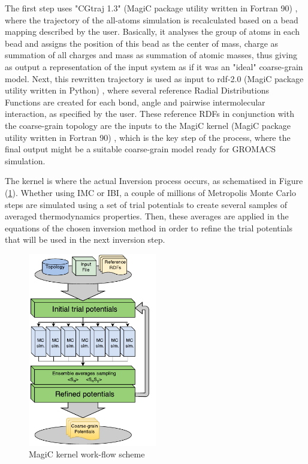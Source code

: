 \documentclass[10pt,a4paper,twoside]{article}
\begin{document}
 The first step uses "CGtraj 1.3" (MagiC package utility written in Fortran 90) \cite{magicmanu}, where the trajectory of the all-atoms simulation is recalculated based on a bead mapping described by the user. Basically, it analyses the group of atoms in each bead and assigns the position of this bead as the center of mass, charge as summation of all charges and mass as summation of atomic masses, thus giving as output a representation of the input system as if it was an "ideal" coarse-grain model. Next, this rewritten trajectory is used as input to rdf-2.0  (MagiC package utility written in Python) \cite{magicmanu}, where several reference Radial Distributions Functions are created for each bond, angle and pairwise intermolecular interaction, as specified by the user. These reference RDFs in conjunction with the coarse-grain topology are the  inputs to the MagiC kernel (MagiC package utility written in Fortran 90) \cite{magicmanu}, which is the key step of the process, where the final output might be a suitable coarse-grain model ready for GROMACS simulation.
 
 The kernel is where the actual Inversion process occurs, as schematised in Figure (\ref{Fig:kernel}). Whether using IMC or IBI, a couple of millions of Metropolis Monte Carlo steps are simulated using a set of trial potentials to create several samples of averaged thermodynamics properties. Then, these averages are applied in the equations of the chosen inversion method in order to refine the trial potentials that will be used in the next inversion step.
 \begin{figure}[ht!]
  \begin{center}
	\includegraphics[width=0.50\textwidth]{./images/magiccore}
	\caption{MagiC kernel work-flow scheme}
	\label{Fig:kernel}
  \end{center}
\end{figure}
 
\end{document}
